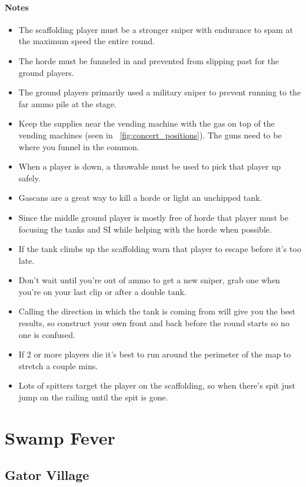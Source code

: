 \paragraph{Notes}
\begin{itemize}
\item The scaffolding player must be a stronger sniper with endurance to spam at the maximum speed the entire round.
\item The horde must be funneled in and prevented from slipping past for the ground players.
\item The ground players primarily used a military sniper to prevent running to the far ammo pile at the stage.
\item Keep the supplies near the vending machine with the gas on top of the vending machines (seen in \figurename\ \ref{fig:concert_positions}). The guns need to be where you funnel in the common.
\item When a player is down, a throwable must be used to pick that player up safely.
\item Gascans are a great way to kill a horde or light an unchipped tank. 
\item Since the middle ground player is mostly free of horde that player must be focusing the tanks and SI while helping with the horde when possible.
\item If the tank climbs up the scaffolding warn that player to escape before it’s too late.
\item Don’t wait until you’re out of ammo to get a new sniper, grab one when you’re on your last clip or after a double tank.
\item Calling the direction in which the tank is coming from will give you the best results, so construct your own front and back before the round starts so no one is confused.
\item If 2 or more players die it’s best to run around the perimeter of the map to stretch a couple mins.
\item Lots of spitters target the player on the scaffolding, so when there's spit just jump on the railing until the spit is gone.
\end{itemize}

\section{Swamp Fever}

\subsection{Gator Village}

